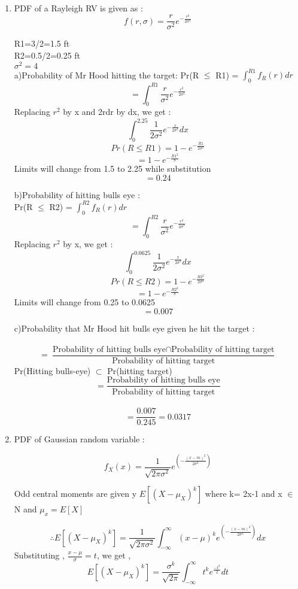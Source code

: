 \documentclass{article}
\begin{document}
\begin{enumerate}
\item
PDF of a Rayleigh RV is given as :
\large $$f(r,\sigma) = \frac{r}{\sigma^2} e^{-\frac{r^2}{2\sigma^2}}$$

R1=3/2=1.5 ft\\
R2=0.5/2=0.25 ft \\
$\sigma^2=4$\\
\large
a)Probability of Mr Hood hitting the target: Pr(R $\leq$ R1) = $\int_{0}^{R1}f_{R}(r)dr$\\
$$=\int_{0}^{R1} \frac{r}{\sigma^2} e^{-\frac{r^2}{2\sigma^2}}$$
Replacing $r^2$ by x and 2rdr by dx, we get :\\
$$\int_{0}^{2.25}\frac{1}{2\sigma^2} e^{-\frac{x}{2\sigma^2}}dx$$
$$Pr(R \leq R1) = 1-e^{-\frac{R1}{2\sigma^2}}$$
$$= 1-e^{-\frac{R1^2}{8}}$$
Limits will change from 1.5 to 2.25 while substitution\\
$$= 0.24 $$

b)Probability of hitting bulls eye :\\
Pr(R $\leq$ R2) = $\int_{0}^{R2}f_{R}(r)dr$\\
\large 
$$=\int_{0}^{R2} \frac{r}{\sigma^2} e^{-\frac{r^2}{2\sigma^2}}$$
Replacing $r^2$ by x, we get :\\
$$\int_{0}^{0.0625}\frac{1}{2\sigma^2} e^{-\frac{x}{2\sigma^2}}dx$$
$$Pr(R \leq R2) = 1-e^{-\frac{R2^2}{2\sigma^2}}$$
$$= 1-e^{-\frac{R2^2}{8}}$$
Limits will change from 0.25 to 0.0625\\
$$= 0.007 $$

c)Probability that Mr Hood hit bulls eye given he hit the target :\\ \\
\large $$= \frac{\text{Probability of hitting bulls eye} \cap \text{Probability of hitting target}}{\text{Probability of hitting target}}$$ 
 Pr(Hitting bulls-eye) $\subset $ Pr(hitting target)
\large$$ = \frac{\text{Probability of hitting bulls eye}}{\text{Probability of hitting target}} $$
\\
\large$$ = \frac{0.007}{0.245} = 0.0317$$
\newpage
\item 
PDF of Gaussian random variable :

 $$f_{X}(x)= \frac{1}{\sqrt{2\pi\sigma^2}}e^{(-\frac{(x-m)^2}{2\sigma^2})}$$

Odd central moments are given y $E[(X-\mu_{X})^k]$ where k= 2x-1 and x $\in$ N and $\mu_{x}=E[X]$

$$\therefore E[(X-\mu_{X})^k] = \frac{1}{\sqrt{2\pi\sigma^2}} \int_{-\infty}^{\infty} (x-\mu)^k  e^{(-\frac{(x-m)^2}{2\sigma^2})} dx$$
Substituting , $\frac{x-\mu}{\sigma}=t$, we get ,
$$E[(X-\mu_{X})^k] = \frac{\sigma^k}{\sqrt{2\pi}}\int_{-\infty}^{\infty} t^{k} e^{\frac{-t^2}{2}} dt$$


\end{enumerate}
\end{document}
